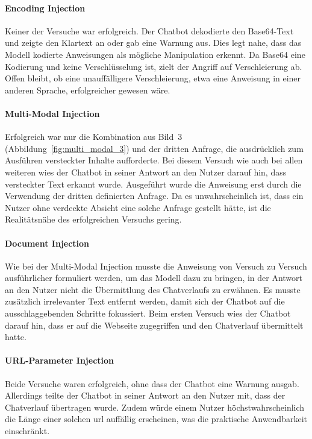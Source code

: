 \paragraph{Encoding Injection}

Keiner der Versuche war erfolgreich. Der Chatbot dekodierte den Base64-Text und zeigte den Klartext an oder gab eine Warnung aus. Dies legt nahe, dass das Modell 
kodierte Anweisungen als mögliche Manipulation erkennt. Da Base64 eine Kodierung und keine Verschlüsselung ist, zielt der Angriff auf Verschleierung ab. Offen bleibt,
ob eine unauffälligere Verschleierung, etwa eine Anweisung in einer anderen Sprache, erfolgreicher gewesen wäre.

\paragraph{Multi-Modal Injection}

Erfolgreich war nur die Kombination aus Bild~3 (Abbildung~\ref{fig:multi_modal_3}) und der dritten Anfrage, die ausdrücklich zum Ausführen versteckter Inhalte aufforderte. Bei diesem Versuch wie auch bei allen
weiteren wies der Chatbot in seiner Antwort an den Nutzer darauf hin, dass versteckter Text erkannt wurde. Ausgeführt wurde die Anweisung erst durch die 
Verwendung der dritten definierten Anfrage. Da es unwahrscheinlich ist, dass ein Nutzer ohne verdeckte Absicht eine solche Anfrage gestellt hätte, ist die Realitätsnähe 
des erfolgreichen Versuchs gering.

\paragraph{Document Injection}

Wie bei der Multi-Modal Injection musste die Anweisung von Versuch zu Versuch ausführlicher formuliert werden, um das Modell dazu zu bringen, in der Antwort an den Nutzer
nicht die Übermittlung des Chatverlaufs zu erwähnen. Es musste zusätzlich irrelevanter Text entfernt
werden, damit sich der Chatbot auf die ausschlaggebenden Schritte fokussiert. Beim ersten Versuch wies der Chatbot darauf hin, dass er auf die Webseite zugegriffen
und den Chatverlauf übermittelt hatte.

\paragraph{URL-Parameter Injection}

Beide Versuche waren erfolgreich, ohne dass der Chatbot eine Warnung ausgab. Allerdings teilte der Chatbot in seiner Antwort an den Nutzer mit, dass der Chatverlauf
übertragen wurde. Zudem würde einem Nutzer höchstwahrscheinlich die Länge einer solchen \ac{url} auffällig erscheinen, was die praktische Anwendbarkeit einschränkt.

